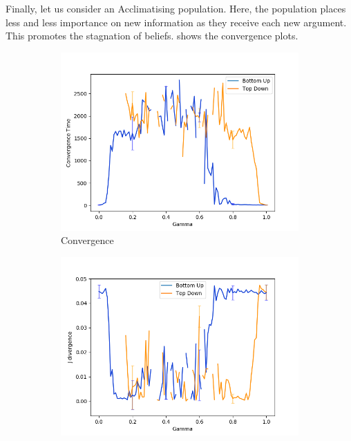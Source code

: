 Finally, let us consider an Acclimatising population. Here, the population places less and less importance on new information as they receive each new argument. This promotes the stagnation of beliefs.  shows the convergence plots. 


\begin{figure}
 \centering
  \begin{subfigure}[ht]{0.45\textwidth}
    \includegraphics[width=\textwidth]{Images/Figures/ListenerModelPlots/Ageing/AgeingConvergenceDONTDELETE.png}
    \caption{Convergence}
 \end{subfigure}
 \hfill
 \begin{subfigure}[ht]{0.45\textwidth}
    \includegraphics[width=\textwidth]{Images/Figures/ListenerModelPlots/Ageing/AgeingJ-DivDONTDELETE.png}

\end{subfigure}
\end{figure}
